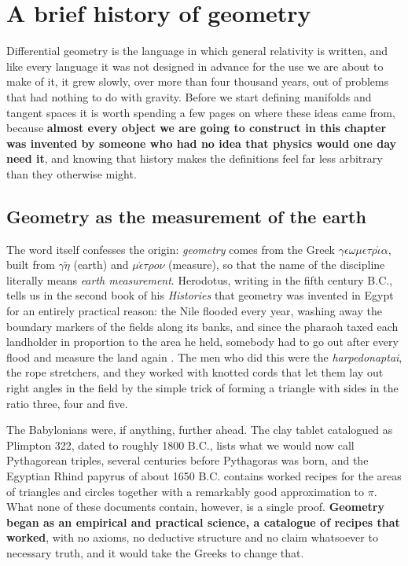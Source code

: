 \section{A brief history of geometry}

    Differential geometry is the language in which general relativity is written, and like every language it was not designed in advance for the use we are about to make of it, it grew slowly, over more than four thousand years, out of problems that had nothing to do with gravity. Before we start defining manifolds and tangent spaces it is worth spending a few pages on where these ideas came from, because \textbf{almost every object we are going to construct in this chapter was invented by someone who had no idea that physics would one day need it}, and knowing that history makes the definitions feel far less arbitrary than they otherwise might.

    \subsection{Geometry as the measurement of the earth}

        The word itself confesses the origin: \textit{geometry} comes from the Greek $\gamma\epsilon\omega\mu\epsilon\tau\rho\acute{\iota}\alpha$, built from $\gamma\tilde{\eta}$ (earth) and $\mu\acute{\epsilon}\tau\rho o\nu$ (measure), so that the name of the discipline literally means \textit{earth measurement}. Herodotus, writing in the fifth century B.C., tells us in the second book of his \textit{Histories} that geometry was invented in Egypt for an entirely practical reason: the Nile flooded every year, washing away the boundary markers of the fields along its banks, and since the pharaoh taxed each landholder in proportion to the area he held, somebody had to go out after every flood and measure the land again \citep{herodotus_histories}. The men who did this were the \textit{harpedonaptai}, the rope stretchers, and they worked with knotted cords that let them lay out right angles in the field by the simple trick of forming a triangle with sides in the ratio three, four and five.

        The Babylonians were, if anything, further ahead. The clay tablet catalogued as Plimpton 322, dated to roughly 1800 B.C., lists what we would now call Pythagorean triples, several centuries before Pythagoras was born, and the Egyptian Rhind papyrus of about 1650 B.C. contains worked recipes for the areas of triangles and circles together with a remarkably good approximation to $\pi$. What none of these documents contain, however, is a single proof. \textbf{Geometry began as an empirical and practical science, a catalogue of recipes that worked}, with no axioms, no deductive structure and no claim whatsoever to necessary truth, and it would take the Greeks to change that.

